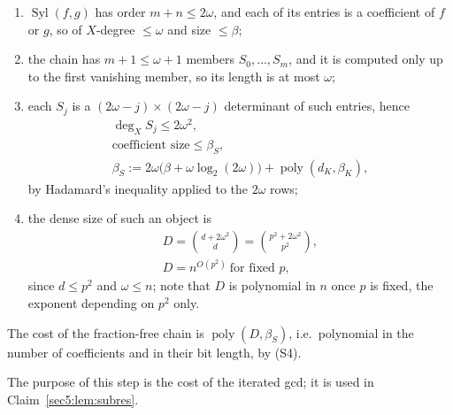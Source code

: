 \documentclass[journal]{IEEEtran}
\theoremstyle{plainn}
\theoremstyle{remark}
\newcommand{\poly}{\operatorname{poly}}
\begin{document}
\begin{enumerate}[label=(\alph*),leftmargin=*]
\item $\operatorname{Syl}(f,g)$ has order $m+n\le2\omega$, and each of its entries is a coefficient of
$f$ or $g$, so of $X$-degree $\le\omega$ and size $\le\beta$;
\item the chain has $m+1\le\omega+1$ members $S_0,\dots,S_m$, and it is computed only up to the first
vanishing member, so its length is at most $\omega$;
\item each $S_j$ is a $(2\omega-j)\times(2\omega-j)$ determinant of such entries, hence
\begin{equation}\label{appBC:eq:sizesout}
\begin{gathered}
\deg_X S_j\le2\omega^{2},\\
\text{coefficient size}\le\beta_S,\\
\beta_S:=2\omega\bigl(\beta+\omega\log_2(2\omega)\bigr)+\poly(d_K,\beta_K),
\end{gathered}
\end{equation}
by Hadamard's inequality applied to the $2\omega$ rows;
\item the dense size of such an object is
\begin{equation}\label{appBC:eq:dense}
\begin{gathered}
D=\binom{d+2\omega^{2}}{d}=\binom{p^{2}+2\omega^{2}}{p^{2}},\\
D=n^{O(p^{2})}\ \text{for fixed } p,
\end{gathered}
\end{equation}
since $d\le p^{2}$ and $\omega\le n$; note that $D$ is polynomial in $n$ once $p$ is fixed, the
exponent depending on $p^{2}$ only.
\end{enumerate}
The cost of the fraction-free chain is $\poly(D,\beta_S)$, i.e.\ polynomial in the number of
coefficients and in their bit length, by (S4).


The purpose of this step is the cost of the iterated gcd; it is used in Claim~\ref{sec5:lem:subres}.
\end{document}
